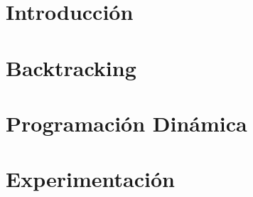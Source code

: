 \documentclass[hidelinks,a4paper, 11pt, nofootinbib]{article}
\begin{document}
\maketitle
\tableofcontents

\newpage

\section{Introducción}


\newpage
\section{Backtracking}


\newpage
\section{Programación Dinámica}



\newpage
\section{Experimentación}

\end{document}
